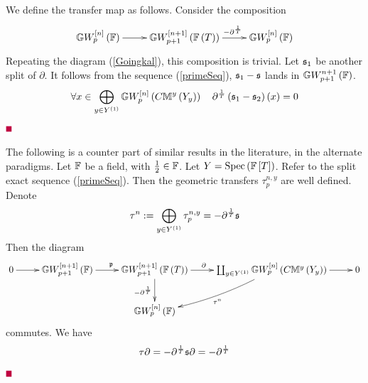 \documentclass[12pt]{article}
\begin{document}
We define the transfer map as follows.
\eD
\pf Consider the composition
$$
\diagram 
{\BG}W^{\LRt{n}}_p\LRf{{\BF}} \ar[r] & {\BG}W^{\LRt{n+1}}_{p+1}\LRf{{\BF}\LRf{T}} \ar[r]^{\quad-\partial^{\frac{1}{T}}} & {\BG}W^{\LRt{n}}_{p}\LRf{{\BF}}\\
\enddiagram  
$$
Repeating the diagram (\ref{Goingkal}), this composition is trivial. Let $\mathfrak {s}_1$ be another split of $\partial$. It follows from the sequence (\ref{primeSeq}), $\mathfrak {s}_1-\mathfrak {s}$ lands in ${\mathbb{G}}W^{n+1}_{p+1}\left( {\mathbb{F}}\right)$. 
$$
\forall x\in \bigoplus_{y\in Y^{\left( 1\right)}} {\mathbb{G}}W_{p}^{\left[ n\right]}\left( C{\mathbb{M}}^y\left( Y_y\right)\right) \quad \partial^{\frac{1}{T}} \left( \mathfrak {s}_1-\mathfrak {s}_2\right)(x)=0
$$
\pic $\eop$


\vspace{3mm}
The following is a counter part of similar results in the literature, in the alternate paradigms.
\bL\label{arrow115}{\rm 
Let ${\mathbb{F}}$ be a field, with $\frac{1}{2}\in {\mathbb{F}}$.
Let $Y=\mathrm{Spec}\left({\mathbb{F}}\left[ T\right]\right)$. Refer to the split exact sequence 
(\ref{primeSeq}).  Then the geometric transfers $\tau^{n, y}_p$ are well defined. Denote
$$
\tau^n:=\bigoplus_{y\in Y^{\left( 1\right)}} \tau^{n, y}_p= -\partial^{\frac{1}{T}}\mathfrak {s}
$$
 Then the diagram 
$$
\diagram 
0  \ar[r] & 
{\BG}W_{p+1}^{\LRt{n+1}}\LRf{{\BF}} \ar[r]^{\p}&
{\BG}W_{p+1}^{\LRt{n+1}}\LRf{{\BF}\LRf{T}}\ar[r]^{\partial\qquad}  \ar[d]_{-\partial^{\frac{1}{T}}}&
\coprod_{y\in Y^{\LRf{1}}} {\BG}W_{p}^{\LRt{n}}\LRf{C{\BM}^y\LRf{Y_y}}  \ar[r] \ar@/^/[dl]^{\tau^n}& 0\\
&&{\BG}W_p^{\LRt{n}}\LRf{{\BF}}&&\\
\enddiagram 
$$
commutes.
}
\eL
\pf We have 
$$
\tau \partial=  -\partial^{\frac{1}{T}}\mathfrak {s} \partial=  -\partial^{\frac{1}{T}}
$$
\pic $\eop$ 
\end{document}
